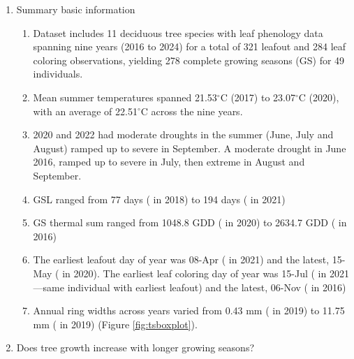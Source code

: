 \begin{enumerate}
\item Summary basic information
  \begin{enumerate}

  \item Dataset includes 11 deciduous tree species with leaf phenology data spanning nine years (2016 to 2024) for a total of 
  321 leafout and 
  284 leaf coloring
   observations, yielding 
  278 complete growing seasons (GS) for 
  49 individuals. 
  
  \item Mean summer temperatures spanned 
  21.53$^\circ$C 
  (2017) to 
  23.07$^\circ$C 
  (2020), with an average of
  22.51$^\circ$C across the nine years.

  \item 2020 and 2022 had moderate droughts in the summer (June, July and August) ramped up to severe in September. A moderate drought in June 2016, ramped up to severe in July, then extreme in August and September. 
  
  \item GSL ranged from 
  77 days ({\Afla} in 
  2018) to 
  194 days ({\Asac} in 
  2021)

  \item GS thermal sum ranged from 
  1048.8 GDD ({\Afla} in 
  2020) to 
  2634.7 GDD ({\Tame} in 
  2016)
  
  \item The earliest leafout day of year was 
  08-Apr ({\Afla} in 
  2021) and the latest, 
  15-May ({\Cova} in 
  2020). The earliest leaf coloring day of year was
  15-Jul ({\Afla} in 
  2021---same individual with earliest leafout) and the latest, 
  06-Nov ({\Tame} in
  2016) 
  
  \item Annual ring widths across years varied from 
  0.43 mm ({\Asac} in 2019) to 
  11.75 mm ({\Tame} in 2019) (Figure \ref{fig:tsboxplot}).
 
\end{enumerate}
\item Does tree growth increase with longer growing seasons?
  \begin{enumerate}


\end{enumerate}
\end{enumerate}
